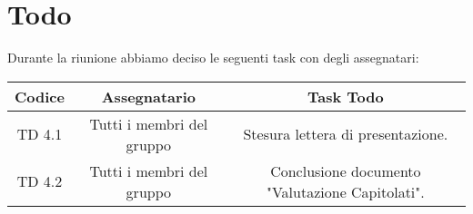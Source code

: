 \section{Todo}

Durante la riunione abbiamo deciso le seguenti task con degli assegnatari:

\vspace{0.5cm}

\begin{table}[htbp]
	\begin{tabular}{|c|c|c|}
		\hline
		\rowcolor[gray]{0.9}
		Codice & Assegnatario & Task Todo \\
		\hline
		TD 4.1 & Tutti i membri del gruppo & Stesura lettera di presentazione. \\
		\hline
		TD 4.2 & Tutti i membri del gruppo & Conclusione documento "Valutazione Capitolati".\\
		\hline
	\end{tabular}
\end{table}